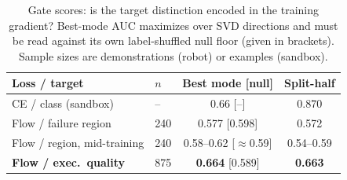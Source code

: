 \begin{table}[t]
\centering
\caption{Gate scores: is the target distinction encoded in the training
gradient? Best-mode AUC maximizes over SVD directions and must be read against
its own label-shuffled null floor (given in brackets). Sample sizes are
demonstrations (robot) or examples (sandbox).}
\label{tab:gates}
\setlength{\tabcolsep}{4pt}
\begin{tabular}{llcc}
\toprule
Loss / target & $n$ & Best mode [null] & Split-half \\
\midrule
CE / class (sandbox)          & --   & 0.66 [--]        & 0.870 \\
Flow / failure region         & 240  & 0.577 [0.598]    & 0.572 \\
Flow / region, mid-training   & 240  & 0.58--0.62 [$\approx$0.59] & 0.54--0.59 \\
\textbf{Flow / exec.\ quality} & 875 & \textbf{0.664} [0.589] & \textbf{0.663} \\
\bottomrule
\end{tabular}
\end{table}

